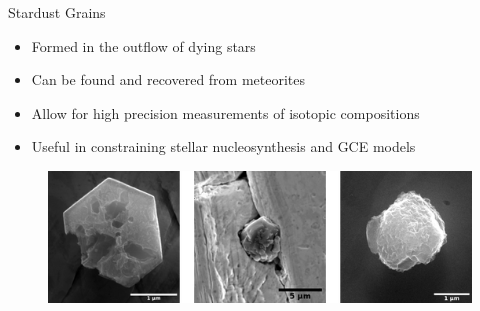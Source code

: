 \documentclass[10pt]{beamer}
\begin{document}
\begin{frame}{Stardust Grains}
    \begin{minipage}{5cm}
    \begin{itemize}
        \setlength\itemsep{1em}
        \item Formed in the outflow of dying stars
        \item Can be found and recovered from meteorites
        \item Allow for high precision measurements of isotopic compositions
        \item Useful in constraining stellar nucleosynthesis and GCE models
    \end{itemize}
    \end{minipage}
    \hspace*{3mm}
    \begin{minipage}{6.1cm}

        \begin{figure}
            \centering
            \includegraphics[width=\textwidth]{figs/stardust.png}
        \end{figure}
    \end{minipage}
    
\end{frame}
\end{document}

